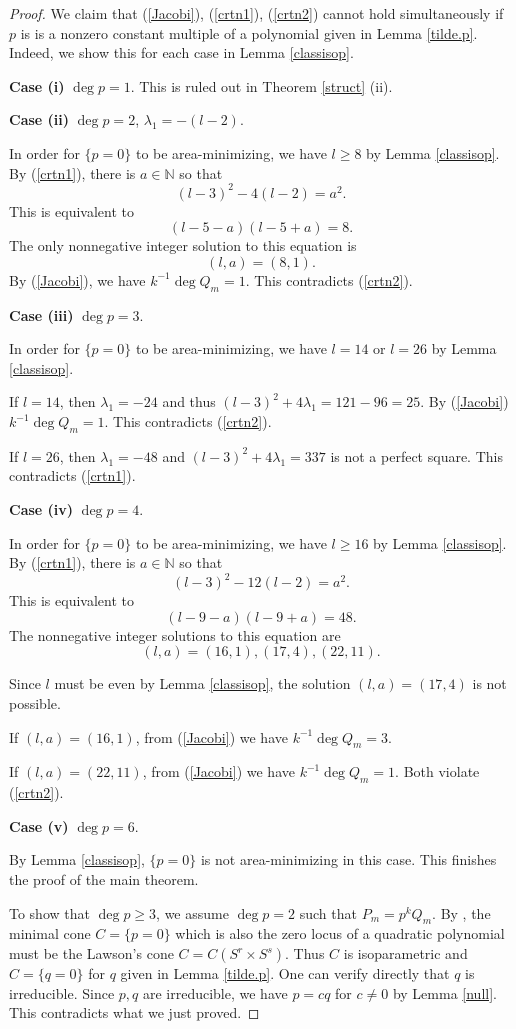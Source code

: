 \documentclass[pdflatex,sn-mathphys-num]{sn-jnl}%
\theoremstyle{thmstyleone}%
\theoremstyle{thmstyletwo}%
\theoremstyle{thmstylethree}%
\newcommand{\N}{\mathbb{N}}
\begin{document}
\begin{proof}
	We claim that (\ref{Jacobi}), (\ref{crtn1}), (\ref{crtn2}) cannot hold simultaneously if $p $ is is a nonzero constant multiple of a polynomial given in Lemma \ref{tilde.p}. Indeed, we show this for each case in Lemma \ref{classisop}.
	
	\textbf{Case (i)}  $\deg p =1$. This is ruled out in Theorem \ref{struct} (ii).
	
	\textbf{Case (ii)} $\deg p =2$, $\lambda_1=-(l-2)$.
	
	In order for $\{p =0\}$ to be area-minimizing, we have $l\ge 8$ by Lemma \ref{classisop}. By (\ref{crtn1}), there is $a\in\N$ so that \[(l-3)^2-4(l-2)=a^2.\]
	This is equivalent to 
	\[(l-5-a)(l-5+a)=8.\]
	The only nonnegative integer solution to this equation is
	\[(l,a)=(8,1).\]
	By (\ref{Jacobi}), we have $k^{-1}\deg Q_m=1$. This contradicts (\ref{crtn2}).
	
	\textbf{Case (iii)} $\deg p =3$.
	
	In order for $\{p =0\}$ to be area-minimizing, we have $l=14$ or $l=26$ by Lemma \ref{classisop}.
	
	If $l=14$, then $\lambda_1=-24$ and thus $(l-3)^2+4\lambda_1=121-96=25$. By (\ref{Jacobi}) $k^{-1}\deg Q_m=1$. This contradicts (\ref{crtn2}).
	
	If $l=26$, then $\lambda_1=-48$ and $(l-3)^2+4\lambda_1=337$ is not a perfect square. This contradicts (\ref{crtn1}).
	
	\textbf{Case (iv)} $\deg p =4$. 
	
	In order for $\{p =0\}$ to be area-minimizing, we have $l\ge 16$ by Lemma \ref{classisop}.
	By (\ref{crtn1}), there is $a\in\N$ so that \[(l-3)^2-12(l-2)=a^2.\]
	This is equivalent to 
	\[(l-9-a)(l-9+a)=48.\]
	The nonnegative integer solutions to this equation are 
	\[(l,a)=(16,1),(17,4),(22,11).\]
	
	Since $l$ must be even by Lemma \ref{classisop}, the solution $(l,a)=(17,4)$ is not possible. 
	
	If $(l,a)=(16,1)$, from (\ref{Jacobi}) we have $k^{-1}\deg Q_m=3$. 
	
	If $(l,a)=(22,11)$, from (\ref{Jacobi}) we have $k^{-1}\deg Q_m=1$. Both violate (\ref{crtn2}).
	
	\textbf{Case (v)} $\deg p =6$.
	
	By Lemma \ref{classisop}, $\{p =0\}$ is not area-minimizing in this case. This finishes the proof of the main theorem.
	
	To show that $\deg p\ge 3$, we assume $\deg p=2$ such that $P_m=p^kQ_m$. By \cite[Observation 4]{Hsiang}, the minimal cone $C=\{p=0\}$ which is also the zero locus of a quadratic polynomial must be the Lawson's cone $C=C(S^r\times S^s)$. Thus $C$ is isoparametric and $C=\{q=0\}$ for $q$ given in Lemma \ref{tilde.p}. One can verify directly that $q$ is irreducible. Since $p,q$ are irreducible, we have $p=cq$ for $c\neq 0$ by Lemma \ref{null}. This contradicts what we just proved.
\end{proof}
\end{document}
